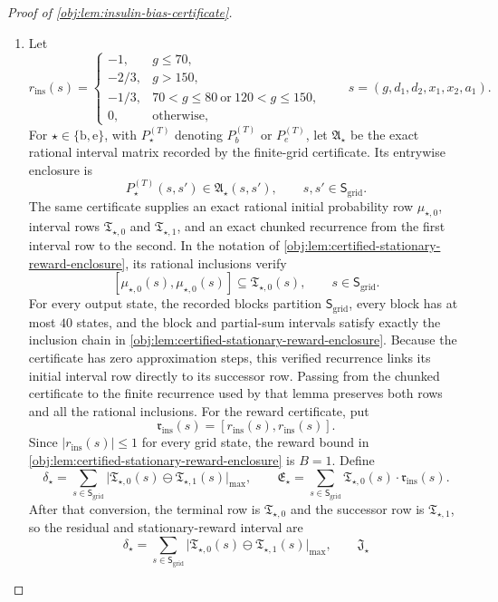\documentclass[11pt]{article}
\begin{document}
\begin{proof}[Proof of \cref{obj:lem:insulin-bias-certificate}]
\begin{enumerate}
\item Let
\[
r_{\mathrm{ins}}(s)=
\begin{cases}
-1,&g\le70,\\
-2/3,&g>150,\\
-1/3,&70<g\le80\ \text{or}\ 120<g\le150,\\
0,&\text{otherwise},
\end{cases}
\qquad s=(g,d_1,d_2,x_1,x_2,a_1).
\]
For \(\star\in\{\mathrm b,\mathrm e\}\), with \(P_\star^{(T)}\) denoting \(P_b^{(T)}\) or \(P_e^{(T)}\), let \(\mathfrak A_\star\) be the exact rational interval matrix recorded by the finite-grid certificate. Its entrywise enclosure is
\[
P_\star^{(T)}(s,s')\in \mathfrak A_\star(s,s'),
\qquad s,s'\in\mathsf S_{\mathrm{grid}}.
\]
The same certificate supplies an exact rational initial probability row \(\mu_{\star,0}\), interval
rows \(\mathfrak T_{\star,0}\) and \(\mathfrak T_{\star,1}\), and an exact chunked recurrence from the
first interval row to the second. In the notation of
\cref{obj:lem:certified-stationary-reward-enclosure}, its rational inclusions verify
\[
[\mu_{\star,0}(s),\mu_{\star,0}(s)]
\subseteq
\mathfrak T_{\star,0}(s),
\qquad s\in\mathsf S_{\mathrm{grid}}.
\]
For every output state, the recorded blocks partition \(\mathsf S_{\mathrm{grid}}\), every block has at
most \(40\) states, and the block and partial-sum intervals satisfy exactly the inclusion chain in
\cref{obj:lem:certified-stationary-reward-enclosure}. Because the certificate has zero approximation
steps, this verified recurrence links its initial interval row directly to its successor row. Passing
from the chunked certificate to the finite recurrence used by that lemma preserves both rows and all
the rational inclusions. For the reward certificate, put
\[
\mathfrak r_{\mathrm{ins}}(s)=[r_{\mathrm{ins}}(s),r_{\mathrm{ins}}(s)].
\]
Since \(|r_{\mathrm{ins}}(s)|\le1\) for every grid state, the reward bound in \cref{obj:lem:certified-stationary-reward-enclosure} is \(B=1\). Define
\[
\delta_\star
=
\sum_{s\in\mathsf S_{\mathrm{grid}}}
\bigl|
\mathfrak T_{\star,0}(s)\ominus
\mathfrak T_{\star,1}(s)
\bigr|_{\max},
\qquad
\mathfrak E_\star
=
\sum_{s\in\mathsf S_{\mathrm{grid}}}
\mathfrak T_{\star,0}(s)\cdot \mathfrak r_{\mathrm{ins}}(s) .
\]
After that conversion, the terminal row is \(\mathfrak T_{\star,0}\) and the successor row is
\(\mathfrak T_{\star,1}\), so the residual and stationary-reward interval are
\[
\delta_\star
=
\sum_{s\in\mathsf S_{\mathrm{grid}}}
\bigl|
\mathfrak T_{\star,0}(s)\ominus
\mathfrak T_{\star,1}(s)
\bigr|_{\max},
\qquad
\mathfrak J_\star
\]
\end{enumerate}
\end{proof}
\end{document}
